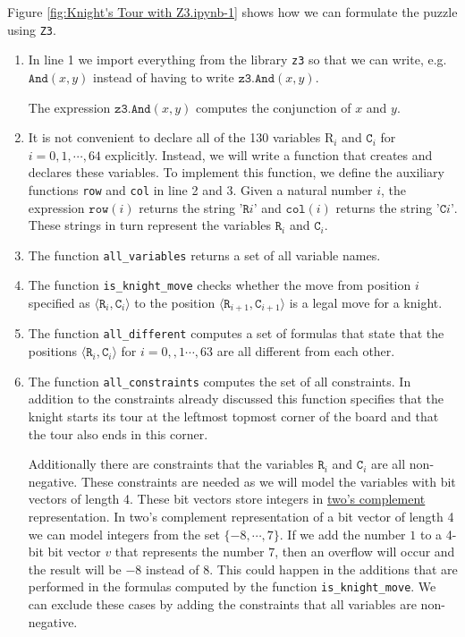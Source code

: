 Figure \ref{fig:Knight's Tour with Z3.ipynb-1} shows how we can formulate the puzzle using \texttt{Z3}.
\begin{enumerate}
\item In line 1 we import everything from the library \texttt{z3} so that we can write,
      e.g.~$\texttt{And}(x, y)$ instead of having to write $\texttt{z3.And}(x, y)$.
  
      The expression $\texttt{z3.And}(x, y)$ computes the conjunction of $x$ and $y$.
\item It is not convenient to declare all of the 130 variables $\mathrm{R}_i$ and $\mathtt{C}_i$ for $i=0,1,\cdots,64$
      explicitly.  Instead, we will write a function that creates and declares these variables.  To implement
      this function, we define the auxiliary functions \texttt{row} and \texttt{col} in line 2 and 3.
      Given a natural number $i$, the expression $\mathtt{row}(i)$ returns the string $\texttt{'R}i\texttt{'}$
      and  $\mathtt{col}(i)$ returns the string  $\texttt{'C}i\texttt{'}$.  These strings in turn represent the
      variables $\mathtt{R}_i$ and $\mathtt{C}_i$.
\item The function \texttt{all\_variables} returns a set of all variable names.
\item The function \texttt{is\_knight\_move} checks whether the move from position $i$ specified as
      $\langle \mathtt{R}_i, \mathtt{C}_i \rangle$ to the position $\langle \mathtt{R}_{i+1}, \mathtt{C}_{i+1} \rangle$
      is a legal move for a knight.
\item The function \texttt{all\_different} computes a set of formulas that state that the positions
      $\langle \mathtt{R}_i, \mathtt{C}_i \rangle$ for $i=0,,1\cdots, 63$ are all different from each other.
\item The function \texttt{all\_constraints} computes the set of all constraints.
      In addition to the constraints already discussed this function specifies that the knight starts
      its tour at the leftmost topmost corner of the board and that the tour also ends in this corner.

      Additionally there are constraints that the variables $\mathtt{R}_i$ and $\mathtt{C}_i$ are all
      non-negative.  These constraints are needed as we will model the variables with bit vectors of length 4.
      These bit vectors store integers in
      \href{https://en.wikipedia.org/wiki/Two%27s_complement}{two's complement} representation.
      In two's complement representation of a bit vector of length 4 we can model integers from the set
      $\{-8, \cdots, 7\}$.  If we add the number $1$ to a 4-bit bit vector $v$ that represents the number $7$,
      then an overflow will occur and the result will be $-8$ instead of $8$. This could happen in the
      additions that are performed in the formulas computed by the function \texttt{is\_knight\_move}.
      We can exclude these cases by adding the constraints that all variables are non-negative.
\end{enumerate}

